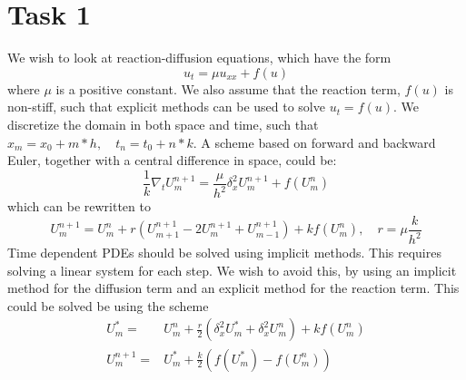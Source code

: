 \section{Task 1}
We wish to look at reaction-diffusion equations, which have the form
$$ u_t = \mu u_{xx} + f(u)$$
where $\mu$ is a positive constant. We also assume that the reaction term, $f(u)$ is non-stiff, such that explicit methods can be used to solve $u_t = f(u)$.
We discretize the domain in both space and time, such that $x_m = x_0 + m*h, \quad t_n = t_0 + n*k$.
A scheme based on forward and backward Euler, together with a central difference in space, could be:
$$ \frac{1}{k}\nabla_tU_{m}^{n+1}=\frac{\mu}{h^2}\delta_x^2U_{m}^{n+1}+f(U_{m}^{n} )$$
which can be rewritten to 
$$U_{m}^{n+1} = U_{m}^{n} + r (U_{m+1}^{n+1}-2U_{m}^{n+1}+U_{m-1}^{n+1}) + kf(U_{m}^{n}), \quad r = \mu\frac{k}{h^2}$$
Time dependent PDEs should be solved using implicit methods. This requires solving a linear system for each step. We wish to avoid this, by using an implicit method for the diffusion term and an explicit method for the reaction term.
This could be solved be using the scheme
\begin{align*}
    U_{m}^{*} =& U_{m}^{n} +\frac{r}{2}(\delta_x^2 U_{m}^{*} + \delta_x^2 U_{m}^{n} ) + kf(U_{m}^{n}) \\
    U_{m}^{n+1} =& U_{m}^{*} + \frac{k}{2}(f(U_{m}^{*}) - f(U_{m}^{n}))
\end{align*}
